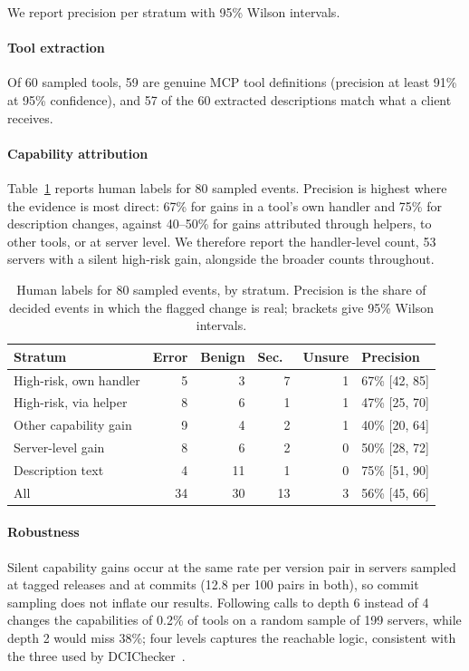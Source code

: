 We report precision per stratum with 95\% Wilson intervals.

\paragraph{Tool extraction}
Of 60 sampled tools, 59 are genuine MCP tool definitions (precision at least 91\% at 95\% confidence), and 57 of the 60 extracted descriptions match what a client receives.

\paragraph{Capability attribution}
Table~\ref{tab:precision} reports human labels for 80 sampled events. Precision is highest where the evidence is most direct: 67\% for gains in a tool's own handler and 75\% for description changes, against 40--50\% for gains attributed through helpers, to other tools, or at server level. We therefore report the handler-level count, 53 servers with a silent high-risk gain, alongside the broader counts throughout.

\begin{table}[t]
\centering\footnotesize
\caption{Human labels for 80 sampled events, by stratum. Precision is the share of decided events in which the flagged change is real; brackets give 95\% Wilson intervals.}\label{tab:precision}
\setlength{\tabcolsep}{2.5pt}
\begin{tabular}{lrrrrl}
\toprule
Stratum & Error & Benign & Sec.\ & Unsure & Precision \\
\midrule
High-risk, own handler   & 5  & 3  & 7  & 1 & 67\% [42, 85] \\
High-risk, via helper    & 8  & 6  & 1  & 1 & 47\% [25, 70] \\
Other capability gain    & 9  & 4  & 2  & 1 & 40\% [20, 64] \\
Server-level gain        & 8  & 6  & 2  & 0 & 50\% [28, 72] \\
Description text         & 4  & 11 & 1  & 0 & 75\% [51, 90] \\
\midrule
All                      & 34 & 30 & 13 & 3 & 56\% [45, 66] \\
\bottomrule
\end{tabular}
\end{table}

\paragraph{Robustness}
Silent capability gains occur at the same rate per version pair in servers sampled at tagged releases and at commits (12.8 per 100 pairs in both), so commit sampling does not inflate our results. Following calls to depth 6 instead of 4 changes the capabilities of 0.2\% of tools on a random sample of 199 servers, while depth 2 would miss 38\%; four levels captures the reachable logic, consistent with the three used by DCIChecker~\cite{dcichecker2026}.
